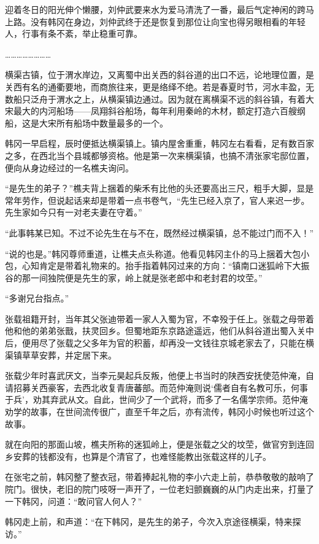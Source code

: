 迎着冬日的阳光伸个懒腰，刘仲武要来水为爱马清洗了一番，最后气定神闲的跨马上路。没有韩冈在身边，刘仲武终于还是恢复到那位让向宝也得另眼相看的年轻人，行事有条不紊，举止稳重可靠。

……………………

横渠古镇，位于渭水岸边，又离蜀中出关西的斜谷道的出口不远，论地理位置，是关西有名的通衢要地，而商旅往来，更是络绎不绝。若是春夏时节，河水丰盈，无数船只泛舟于渭水之上，从横渠镇边通过。因为就在离横渠不远的斜谷镇，有着大宋最大的内河船场——凤翔斜谷船场，每年利用秦岭的木材，额定打造六百艘纲船，这是大宋所有船场中数量最多的一个。

韩冈一早启程，辰时便抵达横渠镇上。镇内屋舍重重，韩冈左右看看，足有数百家之多，在西北当个县城都够资格。他是第一次来横渠镇，也搞不清张家宅邸位置，便向从身边经过的一名樵夫询问。

“是先生的弟子？”樵夫背上捆着的柴禾有比他的头还要高出三尺，粗手大脚，显是常年劳作，但说起话来却是带着一点书卷气，“先生已经入京了，官人来迟一步。先生家如今只有一对老夫妻在守着。”

“此事韩某已知。不过不论先生在与不在，既然经过横渠镇，总不能过门而不入！”

“说的也是。”韩冈尊师重道，让樵夫点头称道。他看见韩冈主仆的马上捆着大包小包，心知肯定是带着礼物来的。抬手指着韩冈过来的方向：“镇南口迷狐岭下大振谷的那一间独院便是先生的家，岭上就是张老郎中和老封君的坟茔。”

“多谢兄台指点。”

张载祖籍开封，当年其父张迪带着一家人入蜀为官，不幸殁于任上。张载之母带着他和他的弟弟张戬，扶灵回乡。但蜀地距东京路途遥远，他们从斜谷道出蜀入关中后，便用尽了张载之父多年为官的积蓄，却再没一文钱往京城老家去了，只能在横渠镇草草安葬，并定居下来。

张载少年时喜武厌文，当李元昊起兵反叛，他便上书当时的陕西安抚使范仲淹，自请招募关西豪客，去西北收复青唐蕃部。而范仲淹则说‘儒者自有名教可乐，何事于兵’，劝其弃武从文。自此，世间少了一个武将，而多了一名儒学宗师。范仲淹劝学的故事，在世间流传很广，直至千年之后，亦有流传，韩冈小时候也听过这个故事。

就在向阳的那面山坡，樵夫所称的迷狐岭上，便是张载之父的坟茔，做官穷到连回乡安葬的钱都没有，也算是个清官了，也难怪能教出张载这样的儿子。

在张宅之前，韩冈整了整衣冠，带着捧起礼物的李小六走上前，恭恭敬敬的敲响了院门。很快，老旧的院门吱呀一声开了，一位老妇颤巍巍的从门内走出来，打量了一下韩冈，问道：“敢问官人何人？”

韩冈走上前，和声道：“在下韩冈，是先生的弟子，今次入京途径横渠，特来探访。”

